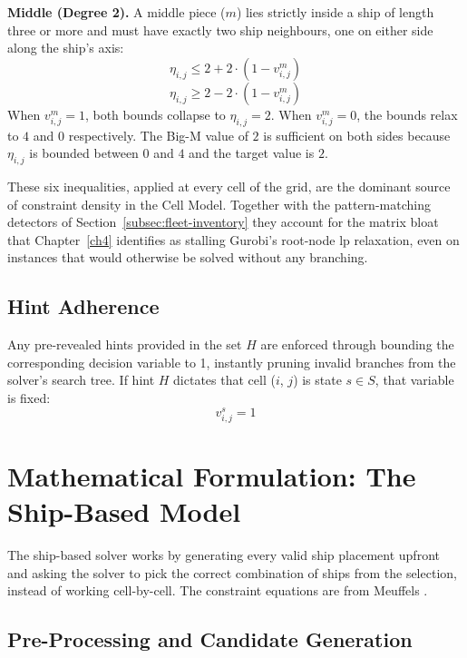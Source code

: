 \textbf{Middle (Degree 2).}
A middle piece ($m$) lies strictly inside a ship of length three or more and must have exactly two ship neighbours, one on either side along the ship's axis:
\begin{equation}
    \eta_{i,j} \leq 2 + 2 \cdot (1 - v_{i,j}^m)
\end{equation}
\begin{equation}
    \eta_{i,j} \geq 2 - 2 \cdot (1 - v_{i,j}^m)
\end{equation}
When $v_{i,j}^m = 1$, both bounds collapse to $\eta_{i,j} = 2$. When $v_{i,j}^m = 0$, the bounds relax to $4$ and $0$ respectively. The Big-M value of $2$ is sufficient on both sides because $\eta_{i,j}$ is bounded between $0$ and $4$ and the target value is $2$.

These six inequalities, applied at every cell of the grid, are the dominant source of constraint density in the Cell Model. Together with the pattern-matching detectors of Section~\ref{subsec:fleet-inventory} they account for the matrix bloat that Chapter~\ref{ch4} identifies as stalling Gurobi's root-node \gls{lp} relaxation, even on instances that would otherwise be solved without any branching.

\subsection{Hint Adherence}\label{subsec:cell-hint-adherence}

Any pre-revealed hints provided in the set $H$ are enforced through bounding the corresponding decision variable to 1, instantly pruning invalid branches from the solver's search tree. If hint $H$ dictates that cell ($i$, $j$) is state $s \in S$, that variable is fixed:
\begin{equation}
    v_{i,j}^s = 1
\end{equation}

\section{Mathematical Formulation: The Ship-Based Model}\label{sec:math-formulation-ship}

The ship-based solver works by generating every valid ship placement upfront and asking the solver to pick the correct combination of ships from the selection, instead of working cell-by-cell. The constraint equations are from Meuffels \citep{meuffels-battleship}.

\subsection{Pre-Processing and Candidate Generation}\label{subsec:pre-proc-and-candidate-gen}

